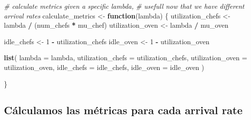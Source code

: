 \documentclass[
]{article}
\newenvironment{Shaded}{\begin{snugshade}}{\end{snugshade}}
\newcommand{\AttributeTok}[1]{\textcolor[rgb]{0.13,0.29,0.53}{#1}}
\newcommand{\CommentTok}[1]{\textcolor[rgb]{0.56,0.35,0.01}{\textit{#1}}}
\newcommand{\ControlFlowTok}[1]{\textcolor[rgb]{0.13,0.29,0.53}{\textbf{#1}}}
\newcommand{\DecValTok}[1]{\textcolor[rgb]{0.00,0.00,0.81}{#1}}
\newcommand{\FunctionTok}[1]{\textcolor[rgb]{0.13,0.29,0.53}{\textbf{#1}}}
\newcommand{\NormalTok}[1]{#1}
\newcommand{\OtherTok}[1]{\textcolor[rgb]{0.56,0.35,0.01}{#1}}
\newcommand{\SpecialCharTok}[1]{\textcolor[rgb]{0.81,0.36,0.00}{\textbf{#1}}}
\begin{document}
\begin{Shaded}
\begin{Highlighting}[]
\CommentTok{\# calculate metrics given a specific lambda,}
\CommentTok{\# usefull now that we have different arrival rates}
\NormalTok{calculate\_metrics }\OtherTok{\textless{}{-}} \ControlFlowTok{function}\NormalTok{(lambda) \{}
\NormalTok{  utilization\_chefs }\OtherTok{\textless{}{-}}\NormalTok{ lambda }\SpecialCharTok{/}\NormalTok{ (num\_chefs }\SpecialCharTok{*}\NormalTok{ mu\_chef)}
\NormalTok{  utilization\_oven }\OtherTok{\textless{}{-}}\NormalTok{ lambda }\SpecialCharTok{/}\NormalTok{ mu\_oven}

\NormalTok{  idle\_chefs }\OtherTok{\textless{}{-}} \DecValTok{1} \SpecialCharTok{{-}}\NormalTok{ utilization\_chefs}
\NormalTok{  idle\_oven }\OtherTok{\textless{}{-}} \DecValTok{1} \SpecialCharTok{{-}}\NormalTok{ utilization\_oven}

  \FunctionTok{list}\NormalTok{(}
    \AttributeTok{lambda =}\NormalTok{ lambda,}
    \AttributeTok{utilization\_chefs =}\NormalTok{ utilization\_chefs,}
    \AttributeTok{utilization\_oven =}\NormalTok{ utilization\_oven,}
    \AttributeTok{idle\_chefs =}\NormalTok{ idle\_chefs,}
    \AttributeTok{idle\_oven =}\NormalTok{ idle\_oven}
\NormalTok{  )}

\NormalTok{\}}
\end{Highlighting}
\end{Shaded}

\subsection{Cálculamos las métricas para cada arrival
rate}\label{cuxe1lculamos-las-muxe9tricas-para-cada-arrival-rate}
\end{document}
